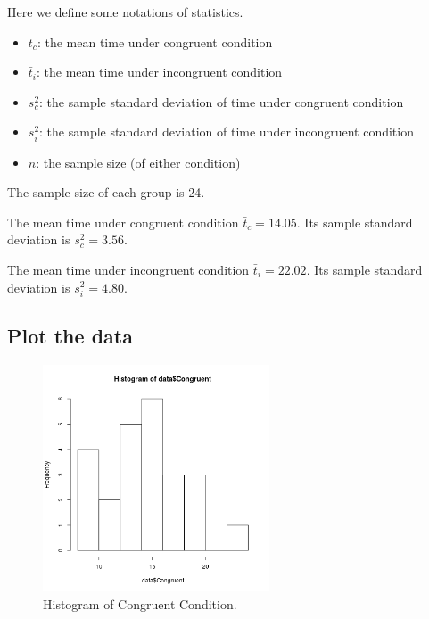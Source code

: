 \documentclass[paper=a4, fontsize=11pt]{scrartcl} %
\numberwithin{equation}{section} %
\numberwithin{figure}{section} %
\numberwithin{table}{section} %
\begin{document}
Here we define some notations of statistics.

\begin{itemize}
    \item $\bar{t}_c$: the mean time under congruent condition
    \item $\bar{t}_i$: the mean time under incongruent condition
    \item $s_c^2$: the sample standard deviation of time under
        congruent condition
    \item $s_i^2$: the sample standard deviation of time under
        incongruent condition
    \item $n$: the sample size (of either condition)
\end{itemize}

The sample size of each group is 24.

The mean time under congruent condition $\bar{t}_c = 14.05$.
Its sample standard deviation is $s_c^2 = 3.56$.

The mean time under incongruent condition $\bar{t}_i = 22.02$.
Its sample standard deviation is $s_i^2 = 4.80$.

\subsection{Plot the data}
\medskip
\noindent{}
\medskip

\clearpage
\begin{figure}[h!]
    \centering
    \includegraphics[width=0.6\textwidth]{hist_congruent.png}
    \caption{Histogram of Congruent Condition.}
    \label{fig:hist-congruent}
\end{figure}
\end{document}
